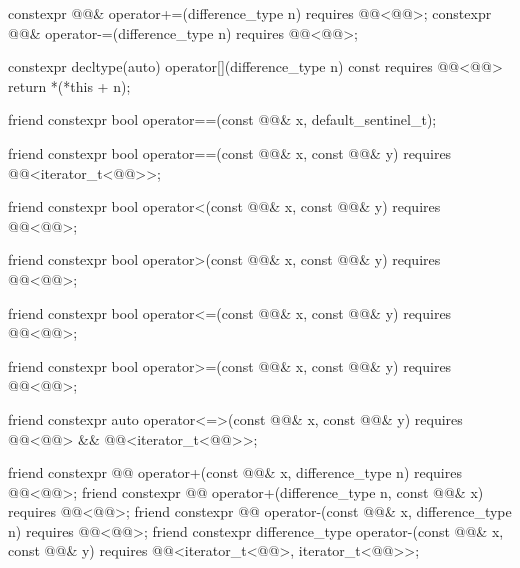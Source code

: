 \begin{codeblock}
{{    constexpr @@& operator+=(difference_type n) requires @@<@@>;
    constexpr @@& operator-=(difference_type n) requires @@<@@>;

    constexpr decltype(auto) operator[](difference_type n) const
      requires @@<@@>
    { return *(*this + n); }

    friend constexpr bool operator==(const @@& x, default_sentinel_t);

    friend constexpr bool operator==(const @@& x, const @@& y)
      requires @@<iterator_t<@@>>;

    friend constexpr bool operator<(const @@& x, const @@& y)
      requires @@<@@>;

    friend constexpr bool operator>(const @@& x, const @@& y)
      requires @@<@@>;

    friend constexpr bool operator<=(const @@& x, const @@& y)
      requires @@<@@>;

    friend constexpr bool operator>=(const @@& x, const @@& y)
      requires @@<@@>;

    friend constexpr auto operator<=>(const @@& x, const @@& y)
      requires @@<@@> && @@<iterator_t<@@>>;

    friend constexpr @@ operator+(const @@& x, difference_type n)
      requires @@<@@>;
    friend constexpr @@ operator+(difference_type n, const @@& x)
      requires @@<@@>;
    friend constexpr @@ operator-(const @@& x, difference_type n)
      requires @@<@@>;
    friend constexpr difference_type operator-(const @@& x, const @@& y)
      requires @@<iterator_t<@@>, iterator_t<@@>>;

}}
\end{codeblock}
